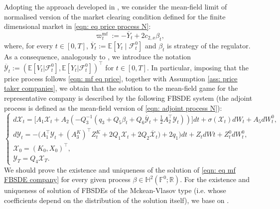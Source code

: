 \documentclass[11pt,twoside]{amsart}
\theoremstyle{definition}
\numberwithin{equation}{section}
\newcommand{\wmf}{\varpi^{\text{mf}}}
\newcommand{\E}{\mathbb{E}}
\newcommand{\F}{\mathbb{F}}
\newcommand{\R}{\mathbb{R}}
\newcommand{\ItF}{\mathcal{F}}
\renewcommand{\bar}{\overline}
\begin{document}
Adopting the approach developed in \cite{fujii2022mean}, we consider the mean-field limit of normalised version of the market clearing condition defined for the finite dimensional market in \eqref{eqn: eq price process N}:
\begin{equation}
\label{eqn: mf eq price}
\wmf_t :=  - \overline{Y}_t + 2c_{2,x} \beta_t,
\end{equation}
where, for every $t \in [0,T]$, $\overline{Y}_t := \E[Y_t\mid \ItF^0_t]$ and $\beta_t$ is strategy of the regulator. As a consequence, analogously to \cite[Section 6]{del2024mean}, we introduce the notation $\overline{\mathcal{Y}}_t := (\E[V_t|\ItF^0_t], \E[Y_t|\ItF^0_t])^\top$ for $t\in[0,T]$. In particular, imposing that the price process follows \eqref{eqn: mf eq price}, together with Assumption \ref{ass: price taker companies}, we obtain that the solution to the mean-field game for the representative company is described by the following FBSDE system (the adjoint process is defined as the mean-field version of \eqref{eqn: adjoint process N}):
\begin{equation}
\label{eqn: eq mf FBSDE company} 
\begin{cases}
d\mathcal{X}_t = \big[ A_1 \mathcal{X}_t + A_2( -Q_3^{-1} ( q_3  + Q_5\beta_t+ Q_6\overline{\mathcal{Y}}_t+ \frac{1}{2}A_2^\top \mathcal{Y}_t))\big] dt + \sigma(\mathcal{X}_t)dW_t + A_5dW^0_t,\\
d\mathcal{Y}_t = -\big( A_1^\top \mathcal{Y}_t + (A^K_3)^\top Z^{K}_t + 2Q_1\mathcal{X}_t + 2Q_2 \bar{\mathcal{X}}_t) + 2q_1 \big)dt + Z_t dWt + Z^{0}_t dW^0_t ,\\
\mathcal{X}_0 = (K_0,X_0)^\top,\\
\mathcal{Y}_T = Q_4\mathcal{X}_T.
\end{cases}
\end{equation}
We should prove the existence and uniqueness of the solution of \eqref{eqn: eq mf FBSDE company} for every given process $\beta\in\mathbb{H}^2(\F^0;\R)$. For the existence and uniqueness of solution of FBSDEs of the Mckean-Vlasov type (i.e. whose coefficients depend on the distribution of the solution itself), we base on \cite{carmona2013mean,carmona2015forward}.
\end{document}
